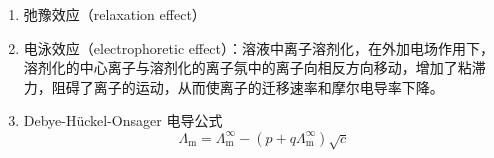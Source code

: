 \begin{enumerate}
    \item 弛豫效应（relaxation effect）
    
    \item 电泳效应（electrophoretic effect）：溶液中离子溶剂化，在外加电场作用下，溶剂化的中心离子与溶剂化的离子氛中的离子向相反方向移动，增加了粘滞力，阻碍了离子的运动，从而使离子的迁移速率和摩尔电导率下降。
    
    \item Debye-Hückel-Onsager 电导公式
    \begin{equation}
        \Lambda_\mathrm{m} = \Lambda_\mathrm{m}^{\infty} - (p + q\Lambda_\mathrm{m}^{\infty}) \sqrt{c}
    \end{equation}
\end{enumerate}